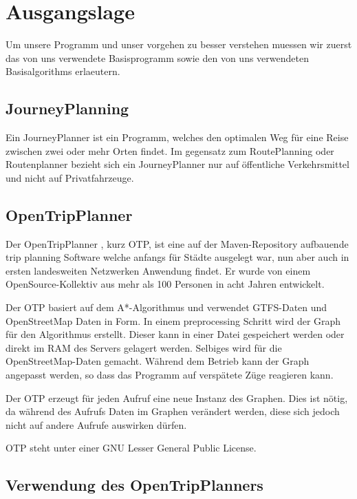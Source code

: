 \section{Ausgangslage}
Um unsere Programm und unser vorgehen zu besser verstehen muessen wir zuerst das von uns verwendete Basisprogramm sowie den von uns verwendeten Basisalgorithms erlaeutern.

\subsection{JourneyPlanning}
Ein JourneyPlanner ist ein Programm, welches den optimalen Weg für eine Reise zwischen zwei oder mehr Orten findet. Im gegensatz zum RoutePlanning oder Routenplanner bezieht sich ein JourneyPlanner nur auf öffentliche Verkehrsmittel und nicht auf Privatfahrzeuge.

\subsection{OpenTripPlanner}

Der OpenTripPlanner \cite{otp}, kurz OTP, ist eine auf der Maven-Repository \cite{maven_repository} 
aufbauende trip planning Software welche anfangs für Städte ausgelegt war, nun aber auch in ersten landesweiten Netzwerken Anwendung findet. Er wurde von einem OpenSource-Kollektiv aus mehr als 100 Personen in acht Jahren entwickelt.

Der OTP basiert auf dem A*-Algorithmus und verwendet GTFS-Daten und OpenStreetMap Daten in Form. In einem preprocessing Schritt wird der Graph für den Algorithmus erstellt. Dieser kann in einer Datei gespeichert werden oder direkt im RAM des Servers gelagert werden. Selbiges wird für die OpenStreetMap-Daten gemacht. Während dem Betrieb kann der Graph angepasst werden, so dass das Programm auf verspätete Züge reagieren kann. \cite{otp_git}

Der OTP erzeugt für jeden Aufruf eine neue Instanz des Graphen. Dies ist nötig, da während des Aufrufs Daten im Graphen verändert werden, diese sich jedoch nicht auf andere Aufrufe auswirken dürfen.

OTP steht unter einer GNU Lesser General Public License. \cite{gnulpl}



\subsection{Verwendung des OpenTripPlanners}


